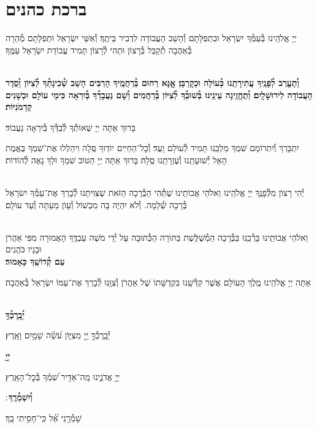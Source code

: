\documentclass[twoside, openany, parskip=half, 11pt]{book}
\begin{document}
\section[ברכת כהנים]{ ברכת כהנים ‎}
\label{birkaskohanim}

יְיָ אֱלֹהֵֽינוּ בְּ֯עַמְּ֯ךָ יִשְׂרָאֵל וּבִתְפִלָּתָם וְ֯הָשֵׁב הָעֲבוֹדָה לִדְבִיר בֵּיתֶֽךָ׃ וְ֯אִשֵּׁי יִשְׂרָאֵל וּתְפִלָּתָם מְ֯הֵרָה בְּ֯אַהֲבָה תְ֯קַבֵּל בְּ֯רָצוֹן וּתְהִי לְ֯רָצוֹן תָּמִיד עֲבוֹדַת יִשְׂרָאֵל עַמֶּֽךָ׃

\chazzanvkahal \\
\textbf{
וְ֯תֶעֱרַב לְ֯פָנֶֽיךָ עֲתִירָתֵֽנוּ כְּ֯עוֹלָה וּכְקׇרְבָּן׃
אׇׇנָּא רַחוּם בְּ֯רַחֲמֶֽיךָ הָרַבִּים הָשֵׁב שְׁ֯כִינָתְ֯ךָ לְ֯צִיּוֹן וְ֯סֵֽדֶר הָעֲבוֹדָה לִירוּשָׁלָֽיִם׃
וְ֯תֶחֱזֶֽינָה עֵינֵֽינוּ בְּ֯שׁוּבְ֯ךָ לְ֯צִיּוֹן בְּ֯רַחֲמִים
וְ֯שָׁם נַעֲבָדְ֯ךָ בְּ֯יִרְאָה כִּימֵי עוֹלָם וּכְשָׁנִים קַדְמֹנִיּוֹת׃
}

\chazzan
בָּרוּךְ אַתָּה יְיָ שֶׁאוֹתְ֯ךָ לְ֯בַדְּ֯ךָ בְּ֯יִרְאָה נַעֲבוֹד׃

\modim

יִתְבָּרַךְ וְ֯יִתְרוֹמַם שִׁמְךָ מַלְכֵּֽנוּ תָּמִיד לְ֯עוֹלָם וָעֶד׃ וְ֯כׇל־הַחַיִּים יוֹדֽוּךָ סֶּֽלָה וִיהַלְלוּ אֶת־שִׁמְךָ בֶּאֱמֶת הָאֵל יְ֯שׁוּעָתֵֽנוּ וְ֯עֶזְרָתֵֽנוּ סֶֽלָה׃ בָּרוּךְ אַתָּה יְיָ הַטּוֹב שִׁמְךָ וּלְךָ נָאֶה לְ֯הוֹדוֹת׃

\\
יְ֯הִי רָצוׂן מִלְּ֯פָנֶֽךָ יְיָ אֱלֹהֵֽינוּ וֵאלֹהֵי אֲבוׂתֵֽינוּ שֶׁתְּ֯הִי הַבְּ֯רָכָה הַזֹּאת שֶׁצִּוִּיתָנוּ לְ֯בָרֵךְ אֶת־עַמְּ֯ךָ יִשׂרָאֵל בְּ֯רָכָה שְׁ֯לֵמָה. וְ֯לֹא יִהְיֶה בָּה מִכְשׁוֹל וְ֯עָוׂן מֵעַתָּה וְ֯עַד עוׂלָם׃

\\
\shatz {}
וֵאלֹהֵי אֲבוֹתֵֽינוּ בָּרְ֯כֵֽנוּ בַּבְּ֯רָכָה הַמְ֯שֻׁלֶּֽשֶׁת בַּתּוֹרָה הַכְּ֯תוּבָה עַל יְ֯דֵי מֹשֶׁה עַבְדֶּֽךָ הָאֲמוּרָה מִפִּי אַהֲרֹן וּבָנָיו כֹּהֲנִים \\
\shatzvkahal
\textbf{עַם קְ֯דוֹשֶֽׁךָ כָּאָמוּר׃}

אַתָּה יְיָ אֱלֹהֵֽינוּ מֶֽלֶךְ הָעוֹלָם אֲשֶׁר קִדְּ֯שָֽׁנוּ בִּקְדֻשָּׁתוֹ שֶׁל אַהֲרֹן וְ֯צִוָּֽנוּ לְ֯בָרֵךְ אֶת־עַמּוֹ יִשְׂרָאֵל בְּ֯אַהֲבָה׃


\\
\textbf{יְ֯בָֽרֶכְ֯ךָ֥}
\hfill \begin{footnotesize}
 יְ֯בָֽרֶכְ֯ךָ֣ יְ֖יָ מִצִּיּ֑וֹן עֹ֝שֵׂ֗ה שָׁמַ֥יִם וָאָֽרֶץ׃\\
\end{footnotesize}
\textbf{יְיָ֖}
\hfill \begin{footnotesize}
 יְיָ֥ אֲדֹנֵ֑ינוּ מָֽה־אַדִּ֥יר שִׁ֝מְ֗ךָ בְּ֯כׇל־הָאָֽרֶץ׃\\
\end{footnotesize}
\textbf{וְ֯יִשְׁמְ֯רֶֽךָ}
׃ \hfill \begin{footnotesize}
 שָׁמְ֯רֵ֥נִי אֵ֝֗ל כִּֽי־חָסִ֥יתִי בָֽךְ׃
\end{footnotesize}
\end{document}
